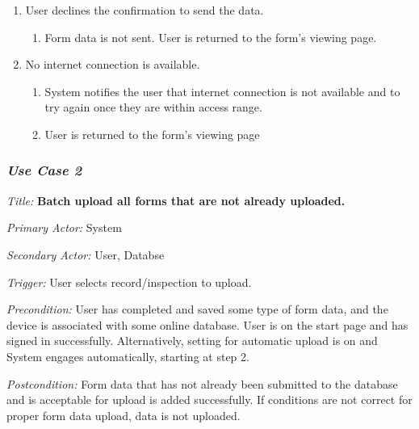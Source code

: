 \documentclass[twoside,letterpaper]{article}
\begin{document}
\begin{enumerate}
\item User declines the confirmation to send the data.
\begin{enumerate}
\item Form data is not sent. User is returned to the form's viewing page.
\end{enumerate}

\item No internet connection is available.
\begin{enumerate}
\item System notifies the user that internet connection is not available and to try again once they are within access range.
\item User is returned to the form's viewing page
\end{enumerate}
\end{enumerate}

\subsubsection{\textit{Use Case 2}}

\textit{Title: }{\bfseries\color{black}Batch upload all forms that are not already uploaded.}

{\color{black} \textit{Primary Actor:} System}

{\color{black} \textit{Secondary Actor:} User, Databse}

{\color{black} \textit{Trigger:} User selects record/inspection to upload.}

{\color{black} \textit{Precondition:}  User has completed and saved some type of form data, and the device is associated with some online database. User is on the start page and has signed in successfully. Alternatively, setting for automatic upload is on and System engages automatically, starting at step 2.}

{\color{black} \textit{Postcondition:} Form data that has not already been submitted to the database and is acceptable for upload is added successfully. If conditions are not correct for proper form data upload, data is not uploaded.}
\end{document}
